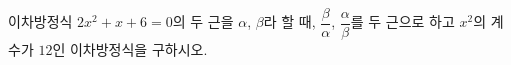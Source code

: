 이차방정식 $2x^2+x+6=0$의 두 근을 $\alpha$, $\beta$라 할 때, $\dfrac{\beta}{\alpha}$, $\dfrac{\alpha}{\beta}$를 두 근으로 하고 $x^2$의 계수가 $12$인 이차방정식을 구하시오.
